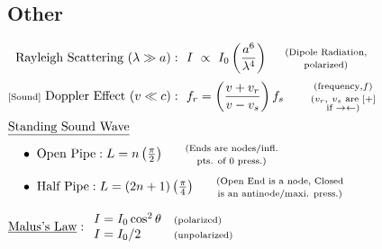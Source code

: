 \documentclass[12pt]{article}
\begin{document}
\begin{minipage}[t]{.51\textwidth}
	\subsection{Other}
	\vspace{10pt}
	\(\begin{aligned}
		&\begin{aligned}
				\text{Rayleigh Scattering}\ (\lambda \gg a):	&\ \ I \ \propto\ I_0\left( \frac{a^6}{\lambda^4} \right)
					\ \ \ \ \begin{gathered}
						\text{\scriptsize(Dipole Radiation,}\\[-5pt]
						\text{\scriptsize polarized)}
					\end{gathered}\\
				\text{{\scriptsize[Sound]} Doppler Effect}\ (v \ll c):	&\ \ 
					f_r = \left( \frac{v + v_r}{v - v_s} \right) f_s
					\hspace{.75cm} \begin{gathered}
						{\scriptstyle(\text{frequency}, f)}\\[-5pt]
						{\scriptstyle(v_r,\ v_s \text{ are } [+]}\\[-8pt]
						{\scriptstyle\text{if } \rightarrow\leftarrow)}
					\end{gathered}
			\end{aligned}\\
		&\underline{\text{Standing Sound Wave}}\\
		&\ \ \ \bullet\ \text{Open Pipe}: L = n \left( \tfrac{\pi}{2} \right) \ \ \ \ \ \begin{gathered}
				\text{\scriptsize(Ends are nodes/infl.}\\[-5pt]
				\text{\scriptsize pts. of 0 press.)}
			\end{gathered}\\
		&\ \ \ \bullet\ \text{Half Pipe}: L = (2n+1) \left( \tfrac{\pi}{4} \right) \ \ \ \ \ \begin{gathered}
				\text{\scriptsize(Open End is a node, Closed}\\[-5pt]
				\text{\scriptsize is an antinode/maxi. press.)}
			\end{gathered}\\[5pt]
		&\text{\underline{Malus's Law}}: \begin{array}{l l}
			I = I_0 \cos^2{\theta} 	&\text{\scriptsize(polarized)}\\
			I = I_0/2 				&\text{\scriptsize(unpolarized)}
		\end{array}
	\end{aligned}\)
\end{minipage}
\end{document}

